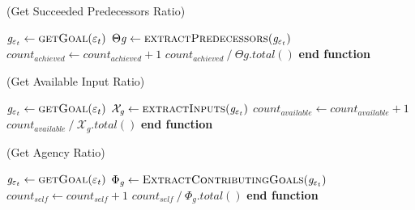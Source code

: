 \documentclass[letterpaper]{article}
\begin{document}
\begin{algorithm}
	\caption{(Get Succeeded Predecessors Ratio)}
	\label{array-sum}
	\begin{algorithmic}[1]
			\Statex
			\State $\mathit{g}_{\varepsilon_t} \gets \Call{getGoal}{\varepsilon_t}$
			\Statex
				\State {}
			\EndIf
			\Statex
			\State $\Theta{\mathit{g}} \gets
			\Call{extractPredecessors}{\mathit{g}_{\varepsilon_t}}$
			\Statex
					\State $count_{achieved} \gets count_{achieved} + 1$
				\EndIf
			\EndFor
			\Statex
			\State \Return
			${count_{achieved} \mathbin{/} {\Theta{\mathit{g}}.total()}}$
		\EndFunction 
	\State \textbf{end function}
	\end{algorithmic}
\end{algorithm}

\begin{algorithm}
	\caption{(Get Available Input Ratio)}
	\label{array-sum}
	\begin{algorithmic}[1]
			\Statex
			\State $\mathit{g}_{\varepsilon_t} \gets \Call{getGoal}{\varepsilon_t}$
			\Statex
				\State {}
			\EndIf
			\Statex
			\State $\mathcal{X}_{\mathit{g}} \gets
			\Call{extractInputs}{\mathit{g}_{\varepsilon_t}}$
			\Statex
					\State $count_{available} \gets count_{available} + 1$
				\EndIf
			\EndFor
			\Statex
			\State \Return
			${count_{available} \mathbin{/} \mathcal{X}_{\mathit{g}}.total()}$
		\EndFunction 
	\State \textbf{end function}
	\end{algorithmic}
\end{algorithm}

\begin{algorithm}
	\caption{(Get Agency Ratio)}
	\label{array-sum}
	\begin{algorithmic}[1]
			\Statex
			\State $\mathit{g}_{\varepsilon_t} \gets \Call{getGoal}{\varepsilon_t}$
			\Statex
				\State {}
			\EndIf
			\Statex
			\State $\Phi_{\mathit{g}} \gets
			\Call{ExtractContributingGoals}{\mathit{g}_{\varepsilon_t}}$
			\Statex
				 \State $count_{self}
				\gets count_{self} + 1$
				\EndIf
			\EndFor
			\Statex
			\State \Return 
			${count_{self} \mathbin{/} {{\Phi_{\mathit{g}}}.total()}}$
		\EndFunction 
	\State \textbf{end function}
	\end{algorithmic}
\end{algorithm}
\end{document}
